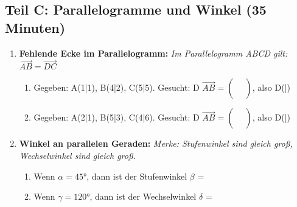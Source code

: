 \subsection*{Teil C: Parallelogramme und Winkel (35 Minuten)}

\begin{enumerate}[label=\arabic*.]

    \item \textbf{Fehlende Ecke im Parallelogramm:}
    \textit{Im Parallelogramm ABCD gilt: $\overrightarrow{AB} = \overrightarrow{DC}$}
    \vspace{0.5cm}

    \begin{enumerate}[label=\alph*)]
        \item Gegeben: A(1|1), B(4|2), C(5|5). Gesucht: D
        $\overrightarrow{AB} = \begin{pmatrix} \phantom{0} \\ \phantom{0} \end{pmatrix}$, also D(\underline{\hspace{1cm}}|\underline{\hspace{1cm}})
        \vspace{0.5cm}

        \item Gegeben: A(2|1), B(5|3), C(4|6). Gesucht: D
        $\overrightarrow{AB} = \begin{pmatrix} \phantom{0} \\ \phantom{0} \end{pmatrix}$, also D(\underline{\hspace{1cm}}|\underline{\hspace{1cm}})
    \end{enumerate}

    \vspace{1cm}

    \item \textbf{Winkel an parallelen Geraden:}
    \textit{Merke: Stufenwinkel sind gleich groß, Wechselwinkel sind gleich groß.}
    \vspace{0.5cm}

    \begin{enumerate}[label=\alph*)]
        \item Wenn $\alpha = 45°$, dann ist der Stufenwinkel $\beta$ = \underline{\hspace{2cm}}
        \vspace{0.5cm}

        \item Wenn $\gamma = 120°$, dann ist der Wechselwinkel $\delta$ = \underline{\hspace{2cm}}
        \vspace{0.5cm}


\end{enumerate}
\end{enumerate}

